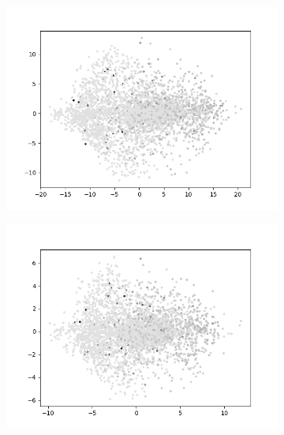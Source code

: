 \begin{figure}[H]
\begin{subfigure}{.25\textwidth}
        \includegraphics[width=\textwidth]{images/figures/experiments_latent/convolutional_dim1024_PCA_dsm.png}
    \end{subfigure}%
    \begin{subfigure}{.25\textwidth}
        \centering
        \includegraphics[width=\textwidth]{images/figures/experiments_latent/convolutional_dim50_PCA_dsm.png}
    \end{subfigure}
    \begin{subfigure}{.25\textwidth}
        \centering

\end{subfigure}
\end{figure}
